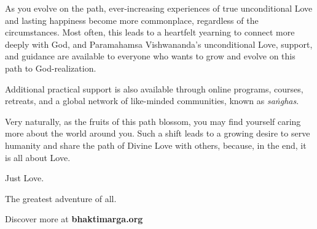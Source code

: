 As you evolve on the path, ever-increasing experiences of true unconditional Love and lasting happiness become more commonplace, regardless of the circumstances. Most often, this leads to a heartfelt yearning to connect more deeply with God, and Paramahamsa Vishwananda’s unconditional Love, support, and guidance are available to everyone who wants to grow and evolve on this path to God-realization.


Additional practical support is also available through online programs, courses, retreats, and a global network of like-minded communities, known as \textit{saṅghas}.

Very naturally, as the fruits of this path blossom, you may find yourself caring more about the world around you. Such a shift leads to a growing desire to serve humanity and share the path of Divine Love with others, because, in the end, it is all about Love.

\noindent Just Love.

\noindent The greatest adventure of all.


\bigskip
\bigskip
{}

\noindent Discover more at \textbf{bhaktimarga.org}